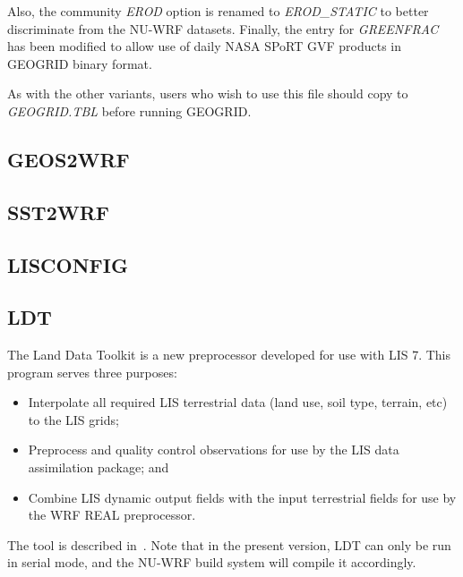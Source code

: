 Also, the community \textit{EROD} option is renamed to \textit{EROD\_STATIC} to
better discriminate from the NU-WRF datasets. Finally, the entry for 
\textit{GREENFRAC} has been modified to allow use of daily NASA SPoRT
GVF products in GEOGRID binary format. 

As with the other variants, users who wish to use this file should copy to 
\textit{GEOGRID.TBL} before running GEOGRID.

\subsection{GEOS2WRF}
\subsection{SST2WRF}
\subsection{LISCONFIG}
\subsection{LDT}

The Land Data Toolkit is a new preprocessor developed for use with LIS 7. This
program serves three purposes:

\begin{itemize}
\item Interpolate all required LIS terrestrial data (land use, soil type, 
terrain, etc) to the LIS grids;
\item Preprocess and quality control observations for use by the
LIS data assimilation package; and
\item Combine LIS dynamic output fields with the input terrestrial fields
for use by the WRF REAL preprocessor.
\end{itemize}

The tool is described in~\cite{ref:LdtUserGuide}. Note that in the present
version, LDT can only be run in serial mode, and the NU-WRF build system 
will compile it accordingly.

